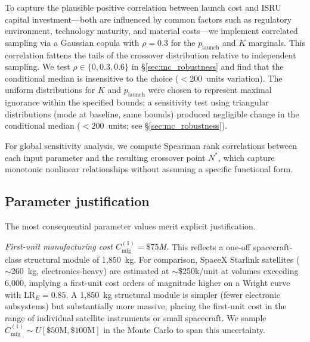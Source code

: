 \documentclass[preprint,12pt]{elsarticle}
\begin{document}
To capture the plausible positive correlation between launch cost and ISRU capital investment---both are influenced by common factors such as regulatory environment, technology maturity, and material costs---we implement correlated sampling via a Gaussian copula with $\rho = 0.3$ for the $p_{\mathrm{launch}}$ and $K$ marginals. This correlation fattens the tails of the crossover distribution relative to independent sampling. We test $\rho \in \{0, 0.3, 0.6\}$ in \S\ref{sec:mc_robustness} and find that the conditional median is insensitive to the choice ($<$200~units variation). The uniform distributions for $K$ and $p_{\mathrm{launch}}$ were chosen to represent maximal ignorance within the specified bounds; a sensitivity test using triangular distributions (mode at baseline, same bounds) produced negligible change in the conditional median ($<200$~units; see \S\ref{sec:mc_robustness}).

For global sensitivity analysis, we compute Spearman rank correlations between each input parameter and the resulting crossover point $N^*$, which capture monotonic nonlinear relationships without assuming a specific functional form.

\subsection{Parameter justification}
\label{sec:param_justification}

The most consequential parameter values merit explicit justification.

\emph{First-unit manufacturing cost $C_{\mathrm{mfg}}^{(1)} = \$75$M.} This reflects a one-off spacecraft-class structural module of 1{,}850~kg. For comparison, SpaceX Starlink satellites ($\sim$260~kg, electronics-heavy) are estimated at $\sim$\$250k/unit at volumes exceeding 6{,}000, implying a first-unit cost orders of magnitude higher on a Wright curve with $\mathrm{LR}_E = 0.85$. A 1{,}850~kg structural module is simpler (fewer electronic subsystems) but substantially more massive, placing the first-unit cost in the range of individual satellite instruments or small spacecraft. We sample $C_{\mathrm{mfg}}^{(1)} \sim U[\$50\text{M}, \$100\text{M}]$ in the Monte Carlo to span this uncertainty.
\end{document}
